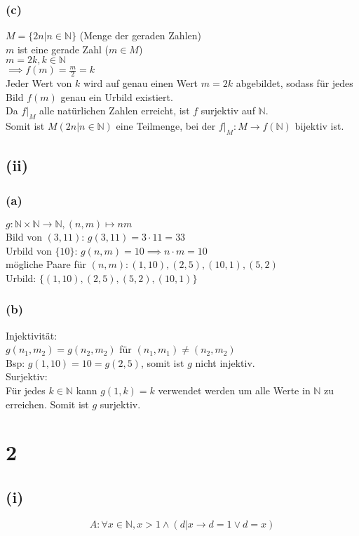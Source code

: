 \documentclass{article}
\begin{document}
\subsubsection{(c)}
$M = \{2n | n \in \mathbb{N}\}$ (Menge der geraden Zahlen) \\
$m$ ist eine gerade Zahl ($m \in M$) \\
$m = 2k, k \in \mathbb{N}$ \\
$\implies f(m) = \frac{m}{2} = k$ \\
Jeder Wert von $k$ wird auf genau einen Wert $m = 2k$ abgebildet, sodass für jedes Bild $f(m)$ genau ein Urbild existiert. \\
Da $f|_M$ alle natürlichen Zahlen erreicht, ist $f$ surjektiv auf $\mathbb{N}$. \\
Somit ist $M(2n | n \in \mathbb{N})$ eine Teilmenge, bei der $f|_M: M \to f(\mathbb{N})$ bijektiv ist.
\subsection{(ii)}
\subsubsection{(a)}
$g: \mathbb{N} \times \mathbb{N} \to \mathbb{N}, (n,m) \mapsto nm$ \\
Bild von $(3, 11)$: $g(3,11) = 3 \cdot 11 = 33$ \\
\newline
Urbild von $\{10\}$: $g(n,m)=10 \implies n \cdot m = 10$ \\
mögliche Paare für $(n,m): (1,10),(2,5),(10,1),(5,2)$ \\
Urbild: $\{(1,10), (2,5), (5,2), (10,1)\}$
\subsubsection{(b)}
Injektivität: \\
$g(n_1, m_2) = g(n_2, m_2)$ für $(n_1,m_1) \neq (n_2, m_2)$ \\
Bsp: $g(1,10) = 10 = g(2,5)$, somit ist $g$ nicht injektiv. \\
Surjektiv: \\
Für jedes $k \in \mathbb{N}$ kann $g(1,k) = k$ verwendet werden um alle Werte in $\mathbb{N}$ zu erreichen. Somit ist $g$ surjektiv.

\section{2}
\subsection{(i)}
\[A: \forall x \in \mathbb{N}, x > 1 \land (d|x \to d = 1 \lor d = x)\]
\end{document}
